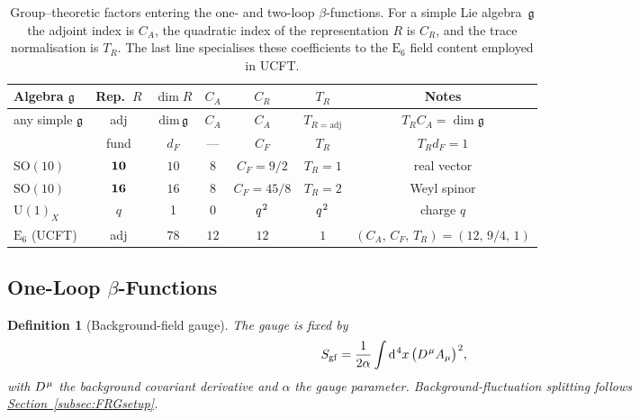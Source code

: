 \documentclass[pdflatex,sn-mathphys-num]{sn-jnl}
\theoremstyle{thmstyleone}
\theoremstyle{thmstyletwo}%
\theoremstyle{thmstylethree}%
\newtheorem{definition}{Definition}%
\newcommand{\SO}[1]{\mathrm{SO(#1)}}
\newcommand{\U}[1]{\mathrm{U(#1)}}
\newcommand{\E}[1]{\mathrm{E_{#1}}}
\newcommand{\SOTen}{\SO{10}}
\newcommand{\ESix}{\E{6}}
\newcommand{\sm}{\hspace{.065em}}
\newcommand{\subsecref}[1]{\hyperref[#1]{Section~\ref*{#1}}}
\newcommand{\smexp}[1]{^{\sm #1}}
\newcommand{\dv}[1]{\mathrm{d}\smexp{#1}}
\begin{document}
\begin{table}[t]
\centering
\caption{Group--theoretic factors entering the one- and two-loop
         $\beta$-functions.  For a simple Lie algebra $\,\mathfrak g$
         the adjoint index is $C_{A}$, the quadratic index of the
         representation $R$ is $C_{R}$, and the trace normalisation is
         $T_{R}$.  The last line specialises these coefficients to the
         $\ESix$ field content employed in UCFT.}
\label{tab:GroupTheory}
\begin{tabular}{@{}lcccccc@{}}
\toprule
Algebra $\mathfrak g$ & Rep.\ $R$ & $\dim R$ &
$C_{A}$ & $C_{R}$ & $T_{R}$ & Notes \\ \midrule
any simple $\mathfrak g$ & adj & $\mathrm{dim}\,\mathfrak g$
& $C_{A}$ & $C_{A}$ & $T_{R=\text{adj}}$ & $T_{R}C_{A}=\dim \mathfrak g$ \\[2pt]
                           & fund & $d_{F}$ & --- & $C_{F}$ &
                           $T_{R}$ & $T_{R}d_{F}=1$ \\[4pt]
$\SOTen$                  & ${\bf 10}$ & $10$ & $8$   & $C_{F}=9/2$ &
$T_{R}=1$ & real vector \\[2pt]
$\SOTen$                  & ${\bf 16}$ & $16$ & $8$   & $C_{F}=45/8$ &
$T_{R}=2$ & Weyl spinor \\[2pt]
$\U{1}_{X}$              & $q$ & 1 & 0 & $q\smexp{2}$ & $q\smexp{2}$ & charge $q$ \\[4pt]
$\ESix$ (UCFT) & adj & $78$ & $12$ & $12$ & $1$ & $(C_{A},\,C_{F},\,T_{R})=(12,\,9/4,\,1)$ \\
\bottomrule
\end{tabular}
\end{table}

\subsection{One-Loop \texorpdfstring{$\beta$}{Beta}-Functions}
\label{subsec:OneLoop}

\begin{definition}[Background-field gauge]\label{def:BFgauge}
The gauge is fixed by
\[
  S_{\mathrm{gf}}
  =\frac1{2\alpha}
    \int\dv{4}x\,
      \bigl(D\smexp{\mu}A_{\mu}\bigr)\smexp{2},
\]
with \(D\smexp{\mu}\) the background covariant derivative and \(\alpha\) the gauge parameter.
Background-fluctuation splitting follows \subsecref{subsec:FRGsetup}.
\end{definition}
\end{document}
